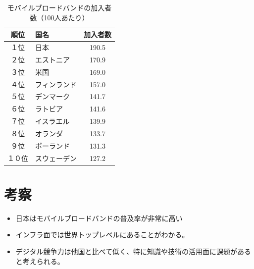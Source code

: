 \documentclass[a4paper,11pt,dvipdfmx]{ujarticle}
\begin{document}
\begin{table}[htbp]
    \centering
    \caption{モバイルブロードバンドの加入者数（100人あたり）}
    \label{tab:broadband}
    \begin{tabular}{|c|l|c|}
        \hline
        順位 & 国名 & 加入者数 \\
        \hline
        １位 & 日本 & 190.5 \\
        \hline
        ２位 & エストニア & 170.9 \\
        \hline
        ３位 & 米国 & 169.0 \\
        \hline
        ４位 & フィンランド & 157.0 \\
        \hline
        ５位 & デンマーク & 141.7 \\
        \hline
        ６位 & ラトビア & 141.6 \\
        \hline
        ７位 & イスラエル & 139.9 \\
        \hline
        ８位 & オランダ & 133.7 \\
        \hline
        ９位 & ポーランド & 131.3 \\
        \hline
        １０位 & スウェーデン & 127.2 \\
        \hline
    \end{tabular}
\end{table}

\section{考察}
\begin{itemize}
    \item 日本はモバイルブロードバンドの普及率が非常に高い
    \item インフラ面では世界トップレベルにあることがわかる。
    \item デジタル競争力は他国と比べて低く、特に知識や技術の活用面に課題があると考えられる。
\end{itemize}



\end{document}
